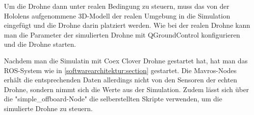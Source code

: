 Um die Drohne dann unter realen Bedingung zu steuern, muss das von der Hololens aufgenommene 3D-Modell der realen Umgebung in die Simulation eingefügt und die Drohne darin platziert werden. Wie bei der realen Drohne kann man die Parameter der simulierten Drohne mit QGroundControl konfigurieren und die Drohne starten.

Nachdem man die Simulatin mit Coex Clover Drohne gestartet hat, hat man das \ac{ROS}-System wie in \ref{softwarearchitektur:section} gestartet.
Die Mavros-Nodes erhält die entsprechenden Daten allerdings nicht von den Sensoren der echten Drohne, sondern nimmt sich die Werte aus der Simulation. Zudem lässt sich über die "simple\_offboard-Node" die selberstellten Skripte verwenden, um die simulierte Drohne zu steuern.

